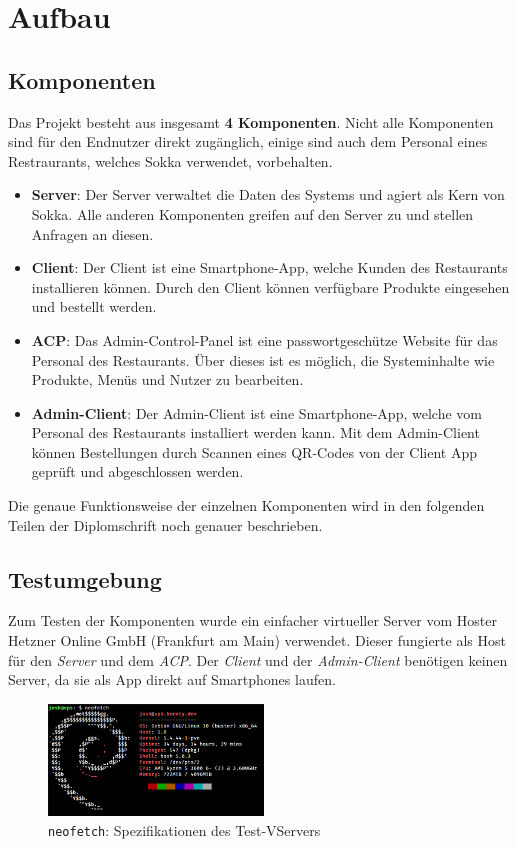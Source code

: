 \chapter{Aufbau}

\section{Komponenten}

Das Projekt besteht aus insgesamt \textbf{4 Komponenten}. Nicht alle Komponenten sind für den Endnutzer direkt zugänglich, einige sind auch dem Personal eines Restraurants, welches Sokka verwendet, vorbehalten.

\begin{itemize}
    \item \textbf{Server}: Der Server verwaltet die Daten des Systems und agiert als Kern von Sokka. Alle anderen Komponenten greifen auf den Server zu und stellen Anfragen an diesen.
    \item \textbf{Client}: Der Client ist eine Smartphone-App, welche Kunden des Restaurants installieren können. Durch den Client können verfügbare Produkte eingesehen und bestellt werden.
    \item \textbf{ACP}: Das Admin-Control-Panel ist eine passwortgeschütze Website für das Personal des Restaurants. Über dieses ist es möglich, die Systeminhalte wie Produkte, Menüs und Nutzer zu bearbeiten.
    \item \textbf{Admin-Client}: Der Admin-Client ist eine Smartphone-App, welche vom Personal des Restaurants installiert werden kann. Mit dem Admin-Client können Bestellungen durch Scannen eines QR-Codes von der Client App geprüft und abgeschlossen werden.
\end{itemize}

Die genaue Funktionsweise der einzelnen Komponenten wird in den folgenden Teilen der Diplomschrift noch genauer beschrieben.

\section{Testumgebung}

Zum Testen der Komponenten wurde ein einfacher virtueller Server vom Hoster Hetzner Online GmbH (Frankfurt am Main) verwendet. Dieser fungierte als Host für den \textit{Server} und dem \textit{ACP}. Der \textit{Client} und der \textit{Admin-Client} benötigen keinen Server, da sie als App direkt auf Smartphones laufen.

\begin{figure}[ht]
    \centering
    \includegraphics[width=0.51\textwidth]{images/Intro/specs.png}
    \caption{\lstinline{neofetch}: Spezifikationen des Test-VServers}
\end{figure}

